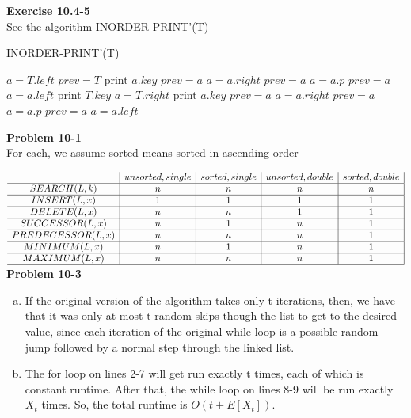 \documentclass{article}
\begin{document}
{\noindent\textbf{ Exercise 10.4-5} \\
See the algorithm INORDER-PRINT'(T)
\begin{algorithm}
\caption{INORDER-PRINT'(T)}
\begin{algorithmic}
\State $a = T.left$
\State $prev = T$
\State print $a.key$
\State $prev = a$
\State $a = a.right$
\State $prev = a$
\State $a = a.p$
\State $prev = a$
\State $a = a.left$
\EndIf
\EndWhile
\State print $T.key$
\State $a = T.right$
\State print $a.key$
\State $prev = a$
\State $a = a.right$
\State $prev = a$
\State $a = a.p$
\State $prev = a$
\State $a = a.left$
\EndIf
\EndWhile
\end{algorithmic}
\end{algorithm}



\noindent\textbf{ Problem 10-1} \\

For each, we assume sorted means sorted in ascending order

$
\begin{array}{c|c|c|c|c|}
&unsorted,single& sorted,single&unsorted,double&sorted,double\\
\hline
SEARCH(L,k)&n&n&n&n\\
\hline
INSERT(L,x)&1&1&1&1\\
\hline
DELETE(L,x)&n&n&1&1\\
\hline
SUCCESSOR(L,x)&n&1&n&1\\
\hline
PREDECESSOR(L,x)&n&n&n&1\\
\hline
MINIMUM(L,x)&n&1&n&1\\
\hline
MAXIMUM(L,x)&n&n&n&1\\
\hline

\end{array}
$
\noindent\textbf{ Problem 10-3} \\

\begin{enumerate}[a.]
\item
If the original version of the algorithm takes only t iterations, then, we have that it was only at most t random skips though the list to get to the desired value, since each iteration of the original while loop is a possible random jump followed by a normal step through the linked list.

\item
The for loop on lines 2-7 will get run exactly t times, each of which is constant runtime. After that, the while loop on lines 8-9 will be run exactly $X_t$ times. So, the total runtime is $O(t+E[X_t])$.


\end{enumerate}}
\end{document}
